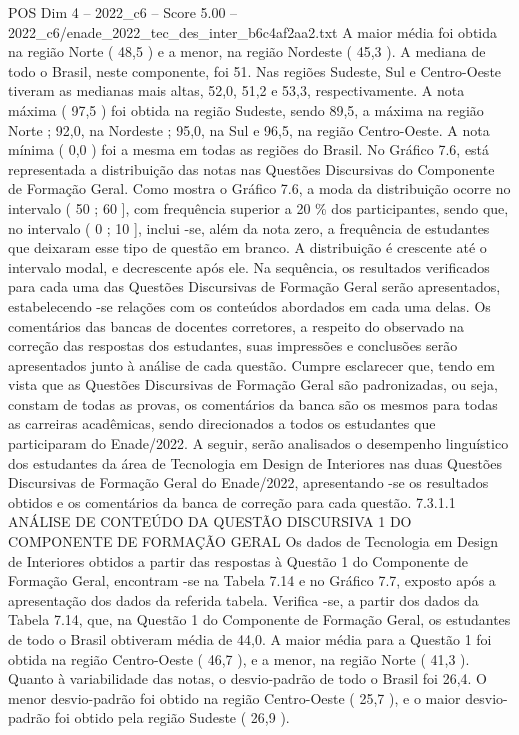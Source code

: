 \begin{textsample}{POS Dim 4 – 2022\_c6 – Score 5.00 – 2022\_c6/enade\_2022\_tec\_des\_inter\_b6c4af2aa2.txt}
A maior média foi obtida na região Norte ( 48,5 ) e a menor, na região Nordeste ( 45,3 ).
A mediana de todo o Brasil, neste componente, foi 51.
Nas regiões Sudeste, Sul e Centro-Oeste tiveram as medianas mais altas, 52,0, 51,2 e 53,3, respectivamente.
A nota máxima ( 97,5 ) foi obtida na região Sudeste, sendo 89,5, a máxima na região Norte ; 92,0, na Nordeste ; 95,0, na Sul e 96,5, na região Centro-Oeste.
A nota mínima ( 0,0 ) foi a mesma em todas as regiões do Brasil.
No Gráfico 7.6, está representada a distribuição das notas nas Questões Discursivas do Componente de Formação Geral.
Como mostra o Gráfico 7.6, a moda da distribuição ocorre no intervalo ( 50 ; 60 ], com frequência superior a 20 \% dos participantes, sendo que, no intervalo ( 0 ; 10 ], inclui -se, além da nota zero, a frequência de estudantes que deixaram esse tipo de questão em branco.
A distribuição é crescente até o intervalo modal, e decrescente após ele.
Na sequência, os resultados verificados para cada uma das Questões Discursivas de Formação Geral serão apresentados, estabelecendo -se relações com os conteúdos abordados em cada uma delas.
Os comentários das bancas de docentes corretores, a respeito do observado na correção das respostas dos estudantes, suas impressões e conclusões serão apresentados junto à análise de cada questão.
Cumpre esclarecer que, tendo em vista que as Questões Discursivas de Formação Geral são padronizadas, ou seja, constam de todas as provas, os comentários da banca são os mesmos para todas as carreiras acadêmicas, sendo direcionados a todos os estudantes que participaram do Enade/2022.
A seguir, serão analisados o desempenho linguístico dos estudantes da área de Tecnologia em Design de Interiores nas duas Questões Discursivas de Formação Geral do Enade/2022, apresentando -se os resultados obtidos e os comentários da banca de correção para cada questão. 7.3.1.1 ANÁLISE DE CONTEÚDO DA QUESTÃO DISCURSIVA 1 DO COMPONENTE DE FORMAÇÃO GERAL Os dados de Tecnologia em Design de Interiores obtidos a partir das respostas à Questão 1 do Componente de Formação Geral, encontram -se na Tabela 7.14 e no Gráfico 7.7, exposto após a apresentação dos dados da referida tabela.
Verifica -se, a partir dos dados da Tabela 7.14, que, na Questão 1 do Componente de Formação Geral, os estudantes de todo o Brasil obtiveram média de 44,0.
A maior média para a Questão 1 foi obtida na região Centro-Oeste ( 46,7 ), e a menor, na região Norte ( 41,3 ).
Quanto à variabilidade das notas, o desvio-padrão de todo o Brasil foi 26,4.
O menor desvio-padrão foi obtido na região Centro-Oeste ( 25,7 ), e o maior desvio-padrão foi obtido pela região Sudeste ( 26,9 ).

\end{textsample}
